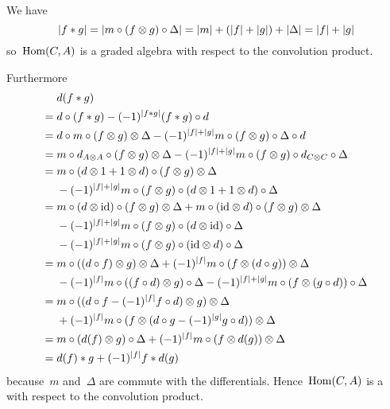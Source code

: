 \documentclass[a4paper,10pt,headings=standardclasses]{scrartcl}
\begin{document}
We have
\[
  \lvert f * g\rvert
  =
  \lvert m \circ (f \otimes g) \circ \Delta\rvert
  =
  \lvert m\rvert + (\lvert f\rvert + \lvert g\rvert) + \lvert\Delta\rvert
  =
  \lvert f\rvert + \lvert g\rvert
\]
so~$\operatorname{Hom}(C,A)$ is a graded algebra with respect to the convolution product.

Furthermore
\begingroup
\allowdisplaybreaks
\begin{align*}
  {}&
  d(f * g)
  \\
  ={}&
  d \circ (f * g)
  -
  (-1)^{\lvert f * g\rvert} (f * g) \circ d
  \\
  ={}&
  d \circ m \circ (f \otimes g) \otimes \Delta
  -
  (-1)^{\lvert f\rvert + \lvert g\rvert}
  m \circ (f \otimes g) \circ \Delta \circ d
  \\
  ={}&
  m \circ d_{A \otimes A} \circ (f \otimes g) \otimes \Delta
  -
  (-1)^{\lvert f\rvert + \lvert g\rvert}
  m \circ (f \otimes g) \circ d_{C \otimes C} \circ \Delta
  \\
  ={}&
  m \circ (d \otimes 1 + 1 \otimes d) \circ (f \otimes g) \otimes \Delta
  \\
  {}&
  -
  (-1)^{\lvert f\rvert + \lvert g\rvert}
  m \circ (f \otimes g) \circ (d \otimes 1 + 1 \otimes d) \circ \Delta
  \\
  ={}&
    m \circ (d \otimes {\operatorname{id}}) \circ (f \otimes g) \otimes \Delta
  + m \circ ({\operatorname{id}} \otimes d) \circ (f \otimes g) \otimes \Delta
  \\
  {}&
  - (-1)^{\lvert f\rvert + \lvert g\rvert} m \circ (f \otimes g) \circ (d \otimes {\operatorname{id}}) \circ \Delta
  \\
  {}&
  - (-1)^{\lvert f\rvert + \lvert g\rvert} m \circ (f \otimes g) \circ ({\operatorname{id}} \otimes d) \circ \Delta
  \\
  ={}&
    m \circ ((d \circ f) \otimes g) \otimes \Delta
  + (-1)^{\lvert f\rvert} m \circ (f \otimes (d \circ g)) \otimes \Delta
  \\
  {}&
  - (-1)^{\lvert f\rvert} m \circ ((f \circ d) \otimes g) \circ \Delta
  - (-1)^{\lvert f\rvert + \lvert g\rvert} m \circ (f \otimes (g \circ d))\circ \Delta
  \\
  ={}&
    m \circ ((d \circ f - (-1)^{\lvert f\rvert} f \circ d) \otimes g) \otimes \Delta
  \\
  {}&
  + (-1)^{\lvert f\rvert} m \circ (f \otimes (d \circ g - (-1)^{\lvert g\rvert} g \circ d)) \otimes \Delta
  \\
  ={}&
    m \circ (d(f) \otimes g) \circ \Delta
  + (-1)^{\lvert f\rvert} m \circ (f \otimes d(g)) \otimes \Delta
  \\
  ={}&
  d(f) * g + (-1)^{\lvert f\rvert} f * d(g)
\end{align*}
\endgroup
because~$m$ and~$\Delta$ are commute with the differentials.
Hence~$\operatorname{Hom}(C,A)$ is a {\dga} with respect to the convolution product.
\end{document}
